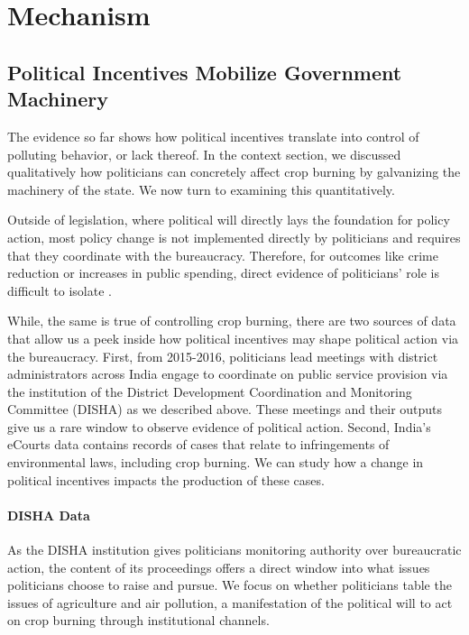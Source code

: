 \documentclass[12pt]{article}
\begin{document}
\section{Mechanism}

\subsection{Political Incentives Mobilize Government Machinery}

The evidence so far shows how political incentives translate into control of polluting behavior, or lack thereof. In the context section, we discussed qualitatively how politicians can concretely affect crop burning by galvanizing the machinery of the state. We now turn to examining this quantitatively. 

Outside of legislation, where political will directly lays the foundation for policy action, most policy change is not implemented directly by politicians and requires that they coordinate with the bureaucracy. Therefore, for outcomes like crime reduction or increases in public spending, direct evidence of politicians' role is difficult to isolate \citet{gulzar2017politicians,agnihotri2026bureaucrat}. 

While, the same is true of controlling crop burning, there are two sources of data that allow us a peek inside how political incentives may shape political action via the bureaucracy. First, from 2015-2016, politicians lead meetings with district administrators across India engage to coordinate on public service provision via the institution of the District Development Coordination and Monitoring Committee (DISHA) as we described above. These meetings and their outputs give us a rare window to observe evidence of political action. Second, India's eCourts data contains records of cases that relate to infringements of environmental laws, including crop burning. We can study how a change in political incentives impacts the production of these cases. 

\paragraph{DISHA Data}
As the DISHA institution gives politicians monitoring authority over bureaucratic action, the content of its proceedings offers a direct window into what issues politicians choose to raise and pursue. We focus on whether politicians table the issues of agriculture and air pollution, a manifestation of the political will to act on crop burning through institutional channels.
\end{document}
